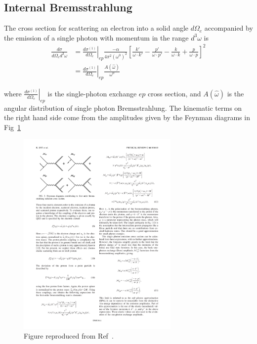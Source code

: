 \subsection{Internal Bremsstrahlung}
The cross section for scattering an electron into a solid angle $d\Omega_e$
accompanied by the emission of a single photon with momentum in the range
$d^3\omega$ is
\begin{align}
    \frac{d\sigma}{d\Omega_e d^3\omega} &=
        \left.\frac{d \sigma^{(1)}}{d \Omega_{e}}\right|_{e p}
        \frac{-\alpha}{4 \pi^{2} (\omega^{0})^2}
        \left[ \frac{k'}{\omega \cdot k'} -
                \frac{p'}{\omega \cdot p'} -
               \frac{k}{\omega \cdot k} +
               \frac{p}{\omega \cdot p}
        \right]^2 \\
     &= \left. \frac{d\sigma^{(1)}}{d\Omega_e}\right|_{ep}
         \frac{A(\hat{\omega})}{\omega^0}
\end{align}

where $\left. \frac{d\sigma^{(1)}}{d\Omega_e}\right|_{ep}$ is the single-photon
exchange $ep$ cross section,
and $A(\hat{\omega})$ is the angular distribution of single photon Bremsstrahlung.
The kinematic terms on the right hand side come from the
amplitudes given by the Feynman diagrams in Fig~\ref{fig:single_photon_brem_feynman}

\begin{figure}[!h]
    \centering
    \includegraphics[width=0.7\textwidth]{chap1/single_photon_brem_feynman.pdf}
    \caption{
             Figure reproduced from Ref~\cite{Ent_2001}.
             }
    \label{fig:single_photon_brem_feynman}
\end{figure}


